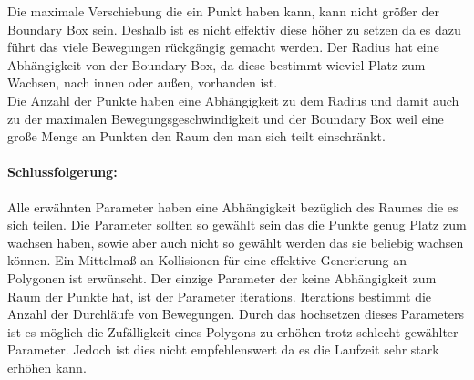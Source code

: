 		Die maximale Verschiebung die ein Punkt haben kann, kann nicht größer 
		der Boundary Box sein. Deshalb ist es nicht effektiv diese höher zu 
		setzen da es dazu führt das viele Bewegungen rückgängig gemacht werden.
		Der Radius hat eine Abhängigkeit von der Boundary Box, da diese 
		bestimmt wieviel Platz zum Wachsen, nach innen oder außen, vorhanden 
		ist.\\
		Die Anzahl der Punkte haben eine Abhängigkeit zu dem Radius und damit 
		auch zu der maximalen Bewegungsgeschwindigkeit und der Boundary Box 
		weil eine große Menge an Punkten den Raum den man sich teilt 
		einschränkt.
		\paragraph{Schlussfolgerung:}
		Alle erwähnten Parameter haben eine Abhängigkeit bezüglich des Raumes 
		die es sich teilen. Die Parameter sollten so gewählt sein das die 
		Punkte genug Platz zum wachsen haben, sowie aber auch nicht so gewählt 
		werden das sie beliebig wachsen können. Ein Mittelmaß an Kollisionen 
		für eine effektive Generierung an Polygonen ist erwünscht.
		Der einzige Parameter der keine Abhängigkeit zum Raum der Punkte hat, 
		ist der Parameter iterations. Iterations bestimmt die Anzahl der 
		Durchläufe von Bewegungen. Durch das hochsetzen dieses Parameters ist 
		es möglich die Zufälligkeit eines Polygons zu erhöhen trotz schlecht 
		gewählter Parameter. Jedoch ist dies nicht empfehlenswert da es die 
		Laufzeit sehr stark erhöhen kann.  

	
